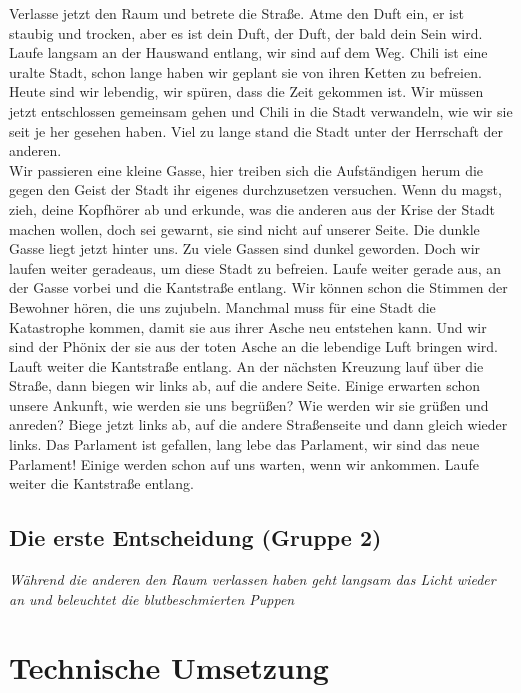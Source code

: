 \documentclass[a4paper, 12pt]{article}
\begin{document}
Verlasse jetzt den Raum und betrete die Straße. 
Atme den Duft ein, er ist staubig und trocken, aber es ist dein Duft, der Duft, der bald dein Sein wird.
Laufe langsam an der Hauswand entlang, wir sind auf dem Weg.
Chili ist eine uralte Stadt, schon lange haben wir geplant sie von ihren Ketten zu befreien. 
Heute sind wir lebendig, wir spüren, dass die Zeit gekommen ist.
Wir müssen jetzt entschlossen gemeinsam gehen und Chili in die Stadt verwandeln, wie wir sie seit je her gesehen haben.
Viel zu lange stand die Stadt unter der Herrschaft der anderen. \\

Wir passieren eine kleine Gasse, hier treiben sich die Aufständigen herum die gegen den Geist der Stadt ihr eigenes durchzusetzen versuchen.
Wenn du magst, zieh, deine Kopfhörer ab und erkunde, was die anderen aus der Krise der Stadt machen wollen, doch sei gewarnt, sie sind nicht auf unserer Seite.
Die dunkle Gasse liegt jetzt hinter uns. 
Zu viele Gassen sind dunkel geworden. 
Doch wir laufen weiter geradeaus, um diese Stadt zu befreien.
Laufe weiter gerade aus, an der Gasse vorbei und die Kantstraße entlang. 
Wir können schon die Stimmen der Bewohner hören, die uns zujubeln. 
Manchmal muss für eine Stadt die Katastrophe kommen, damit sie aus ihrer Asche neu entstehen kann.
Und wir sind der Phönix der sie aus der toten Asche an die lebendige Luft bringen wird.
Lauft weiter die Kantstraße entlang.
An der nächsten Kreuzung lauf über die Straße, dann biegen wir links ab, auf die andere Seite.
Einige erwarten schon unsere Ankunft, wie werden sie uns begrüßen?
Wie werden wir sie grüßen und anreden?
Biege jetzt links ab, auf die andere Straßenseite und dann gleich wieder links. 
Das Parlament ist gefallen, lang lebe das Parlament, wir sind das neue Parlament!
Einige werden schon auf uns warten, wenn wir ankommen.
Laufe weiter die Kantstraße entlang. 




\subsection{Die erste Entscheidung (Gruppe 2)}
\textit{Während die anderen den Raum verlassen haben geht langsam das Licht wieder an und beleuchtet die blutbeschmierten Puppen}

\section{Technische Umsetzung}\label{technische_umsetzung}
   
\printbibliography
 
\end{document}
